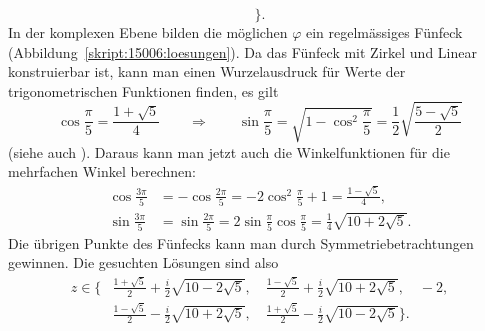 \begin{loesung}
\[\biggr\}.
\]
In der komplexen Ebene bilden die möglichen $\varphi$ ein regelmässiges
Fünfeck (Abbildung~\ref{skript:15006:loesungen}).
Da das Fünfeck mit Zirkel und Linear konstruierbar ist, kann man
einen Wurzelausdruck für Werte der trigonometrischen Funktionen 
finden, es gilt
\[
\cos\frac{\pi}{5}=\frac{1+\sqrt{5}}4
\qquad
\Rightarrow
\qquad
\sin\frac{\pi}5
=
\sqrt{1-\cos^2\frac{\pi}5}
=
\frac12\sqrt{\frac{5-\sqrt{5}}2}
\]
(siehe auch \cite{skript:pentagon}).
Daraus kann man jetzt auch die Winkelfunktionen für die mehrfachen
Winkel berechnen:
\begin{align*}
\cos\frac{3\pi}5
&=
-\cos\frac{2\pi}5
=
-2\cos^2\frac{\pi}5+1
=
\frac{1-\sqrt{5}}4,
\\
\sin\frac{3\pi}5
&=
\sin\frac{2\pi}5
=
2\sin\frac{\pi}5\cos\frac{\pi}5
=
\frac14\sqrt{10+2\sqrt{5}}.
\end{align*}
Die übrigen Punkte des Fünfecks kann man durch Symmetriebetrachtungen
gewinnen.
Die gesuchten Lösungen sind also
\begin{align*}
z
\in
\biggl\{
&
\frac{1+\sqrt{5}}2+\frac{i}2\sqrt{10-2\sqrt{5}},\quad
\frac{1-\sqrt{5}}2 + \frac{i}2\sqrt{10+2\sqrt{5}},\quad
-2,
\\
&
\frac{1-\sqrt{5}}2 - \frac{i}2\sqrt{10+2\sqrt{5}},\quad
\frac{1+\sqrt{5}}2-\frac{i}2\sqrt{10-2\sqrt{5}}
\biggr\}.
\end{align*}
\end{loesung}

